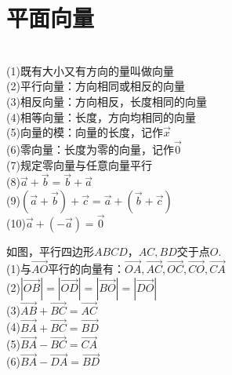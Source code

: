 \documentclass{ecnuthesis}
\begin{document}
\section{平面向量}
\begin{knowledge}
    $\quad$ \\
    (1)既有大小又有方向的量叫做向量 \\
    (2)平行向量：方向相同或相反的向量 \\
    (3)相反向量：方向相反，长度相同的向量 \\
    (4)相等向量：长度，方向均相同的向量 \\
    (5)向量的模：向量的长度，记作$\vec{x}$ \\
    (6)零向量：长度为零的向量，记作$\vec{0}$ \\
    (7)规定零向量与任意向量平行 \\
    (8)$\vec{a}+\vec{b}=\vec{b}+\vec{a}$ \\
    (9)$(\vec{a}+\vec{b})+\vec{c}=\vec{a}+(\vec{b}+\vec{c})$ \\
    (10)$\vec{a}+(-\vec{a})=\vec{0}$
\end{knowledge}
\begin{model}
    如图，平行四边形$ABCD$，$AC,BD$交于点$O$. \\
    (1)与$\overrightarrow{AO}$平行的向量有：$\overrightarrow{OA},\overrightarrow{AC},\overrightarrow{OC},\overrightarrow{CO},\overrightarrow{CA}$ \\
    (2)$|\overrightarrow{OB}|=|\overrightarrow{OD}|=|\overrightarrow{BO}|=|\overrightarrow{DO}|$ \\
    (3)$\overrightarrow{AB}+\overrightarrow{BC}=\overrightarrow{AC}$ \\
    (4)$\overrightarrow{BA}+\overrightarrow{BC}=\overrightarrow{BD}$ \\
    (5)$\overrightarrow{BA}-\overrightarrow{BC}=\overrightarrow{CA}$ \\
    (6)$\overrightarrow{BA}-\overrightarrow{DA}=\overrightarrow{BD}$ \\
\end{model}
\end{document}
